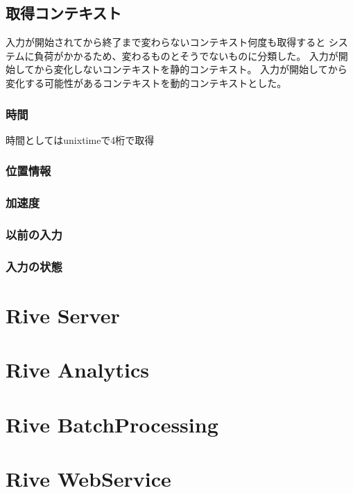 \subsection{取得コンテキスト}
入力が開始されてから終了まで変わらないコンテキスト何度も取得すると
システムに負荷がかかるため、変わるものとそうでないものに分類した。
入力が開始してから変化しないコンテキストを静的コンテキスト。
入力が開始してから変化する可能性があるコンテキストを動的コンテキストとした。


\subsubsection{時間}
時間としてはunixtimeで4桁で取得
\subsubsection{位置情報}
\subsubsection{加速度}
\subsubsection{以前の入力}
\subsubsection{入力の状態}

\subsection{}

\section{Rive Server}

\section{Rive Analytics}

\section{Rive BatchProcessing}

\section{Rive WebService}
